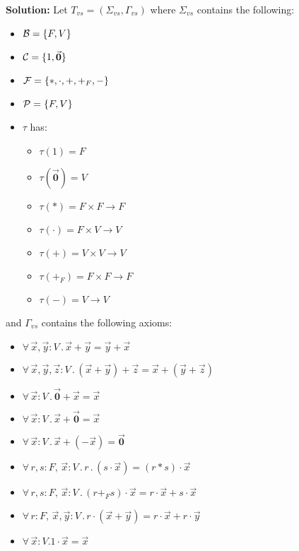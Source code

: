 \documentclass[11pt,fleqn]{article}
\newcommand{\sB}{\mbox{$\cal B$}}
\newcommand{\sC}{\mbox{$\cal C$}}
\newcommand{\sF}{\mbox{$\cal F$}}
\newcommand{\sP}{\mbox{$\cal P$}}
\newcommand{\set}[1]{{\{ #1 \}}}
\newcommand{\ForallApp}{\forall\,}
\newcommand{\mdot}{\mathrel.}
\begin{document}
\textbf{Solution:}
Let $T_{vs} = (\Sigma_{vs},\Gamma_{vs})$ where $\Sigma_{vs}$ contains the following:
\begin{itemize}
  \item $\sB = \set{F, V}$
  \item $\sC = \set{1, \vec{\mathbf{0}}}$
  \item $\sF = \set{*, \cdot, +, +_F, -}$
  \item $\sP = \set{F, V}$
  \item $\tau$ has:
        \begin{itemize}
          \item $\tau(1) = F$
          \item $\tau(\vec{\mathbf{0}}) = V$
          \item $\tau(*) = F \times F \rightarrow F$
          \item $\tau(\cdot) = F \times V \rightarrow V$
          \item $\tau(+) = V \times V \rightarrow V$
          \item $\tau(+_F) = F \times F \rightarrow F$
          \item $\tau(-) = V \rightarrow V$
        \end{itemize}
\end{itemize}

and $\Gamma_{vs}$ contains the following axioms:
\begin{itemize}
  \item $\ForallApp \vec x, \vec y: V \mdot \vec x + \vec y = \vec y + \vec x$
  \item $\ForallApp \vec x, \vec y, \vec z: V \mdot (\vec x + \vec y) + \vec z = \vec x + (\vec y + \vec z)$
  \item $\ForallApp \vec x : V \mdot \vec{\mathbf{0}} + \vec x = \vec x$
  \item $\ForallApp \vec x : V \mdot \vec x + \vec{\mathbf{0}} = \vec x$
  \item $\ForallApp \vec x : V \mdot \vec x + (- \vec x) = \vec{\mathbf{0}}$
  \item $\ForallApp r, s : F,\,\vec x : V \mdot r \mdot (s \cdot \vec x) = (r * s) \cdot \vec x$
  \item $\ForallApp r, s : F,\,\vec x : V \mdot (r +_F s) \cdot \vec x = r \cdot \vec x + s \cdot \vec x$
  \item $\ForallApp r : F,\,\vec x, \vec y : V \mdot r \cdot (\vec x + \vec y) = r \cdot \vec x + r \cdot \vec y$
  \item $\ForallApp \vec x : V \mdot 1 \cdot \vec x = \vec x$
\end{itemize}
\end{document}
